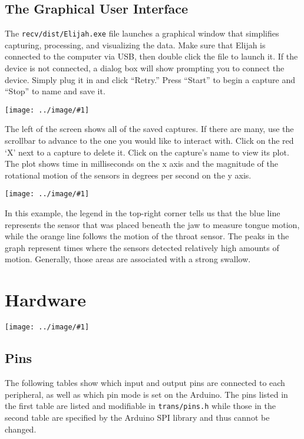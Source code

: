 \documentclass{article}
\newcommand{\img}[2]{
    \begin{center}
        \texttt{[image: ../image/\#1]}
    \end{center}    
}
\begin{document}
        \subsection{The Graphical User Interface}
        The \texttt{recv/dist/Elijah.exe} file launches a graphical window that simplifies capturing, processing, and visualizing the data. Make sure that Elijah is connected to the computer via USB, then double click the file to launch it. If the device is not connected, a dialog box will show prompting you to connect the device. Simply plug it in and click ``Retry.'' Press ``Start'' to begin a capture and ``Stop'' to name and save it.
        \vspace{8pt}
        \img{gui_full}{0.73}
        \vspace{8pt}
        The left of the screen shows all of the saved captures. If there are many, use the scrollbar to advance to the one you would like to interact with. Click on the red `X' next to a capture to delete it. Click on the capture's name to view its plot. The plot shows time in milliseconds on the x axis and the magnitude of the rotational motion of the sensors in degrees per second on the y axis.
        
        \img{plot}{0.432}
        
        In this example, the legend in the top-right corner tells us that the blue line represents the sensor that was placed beneath the jaw to measure tongue motion, while the orange line follows the motion of the throat sensor. The peaks in the graph represent times where the sensors detected relatively high amounts of motion. Generally, those areas are associated with a strong swallow.
        
    \section{Hardware}
    
    \img{unlit_a}{0.1252}
    
    \subsection{Pins}
    The following tables show which input and output pins are connected to each peripheral, as well as which pin mode is set on the Arduino. The pins listed in the first table are listed and modifiable in \texttt{trans/pins.h} while those in the second table are specified by the Arduino SPI library and thus cannot be changed.\newline
    
\end{document}
